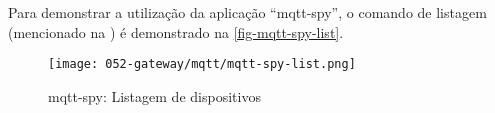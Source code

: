 Para demonstrar a utilização da aplicação ``mqtt-spy'', o comando de listagem
(mencionado na ) é demonstrado na
\autoref{fig-mqtt-spy-list}.

\begin{figure}[htb]
	\centering
	\caption{\label{fig-mqtt-spy-list}mqtt-spy: Listagem de dispositivos}
	\texttt{[image: 052-gateway/mqtt/mqtt-spy-list.png]}
\end{figure}
